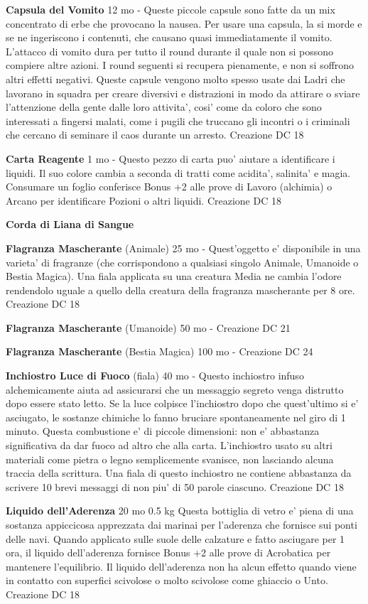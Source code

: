 \documentclass[a4paper,11pt,twoside,openany]{book}
\begin{document}
{\textbf{Capsula del Vomito} 12 mo - Queste piccole capsule sono fatte da un mix concentrato di erbe che provocano la nausea. Per usare una capsula, la si morde e se ne ingeriscono i contenuti, che causano quasi immediatamente il vomito. L'attacco di vomito dura per tutto il round durante il quale non si possono compiere altre azioni. I round seguenti si recupera pienamente, e non si soffrono altri effetti negativi. Queste capsule vengono molto spesso usate dai Ladri che lavorano in squadra per creare diversivi e distrazioni in modo da attirare o sviare l'attenzione della gente dalle loro attivita', cosi' come da coloro che sono interessati a fingersi malati, come i pugili che truccano gli incontri o i criminali che cercano di seminare il caos durante un arresto. Creazione DC 18

\textbf{Carta Reagente} 1 mo - Questo pezzo di carta puo' aiutare a identificare i liquidi. Il suo colore cambia a seconda di tratti come acidita', salinita' e magia. Consumare un foglio conferisce Bonus +2 alle prove di Lavoro (alchimia) o Arcano per identificare Pozioni o altri liquidi. Creazione DC 18

\textbf{Corda di Liana di Sangue}

\textbf{Flagranza Mascherante} (Animale) 25 mo - Quest'oggetto e' disponibile in una varieta' di fragranze (che corrispondono a qualsiasi singolo Animale, Umanoide o Bestia Magica). Una fiala applicata su una creatura Media ne cambia l'odore rendendolo uguale a quello della creatura della fragranza mascherante per 8 ore. Creazione DC 18

\textbf{Flagranza Mascherante} (Umanoide) 50 mo - Creazione DC 21

\textbf{Flagranza Mascherante} (Bestia Magica) 100 mo - Creazione DC 24

\textbf{Inchiostro Luce di Fuoco} (fiala) 40 mo - Questo inchiostro infuso alchemicamente aiuta ad assicurarsi che un messaggio segreto venga distrutto dopo essere stato letto. Se la luce colpisce l'inchiostro dopo che quest'ultimo si e' asciugato, le sostanze chimiche lo fanno bruciare spontaneamente nel giro di 1 minuto. Questa combustione e' di piccole dimensioni: non e' abbastanza significativa da dar fuoco ad altro che alla carta. L'inchiostro usato su altri materiali come pietra o legno semplicemente svanisce, non lasciando alcuna traccia della scrittura. Una fiala di questo inchiostro ne contiene abbastanza da scrivere 10 brevi messaggi di non piu' di 50 parole ciascuno. Creazione DC 18

\textbf{Liquido dell'Aderenza} 20 mo 0.5 kg Questa bottiglia di vetro e' piena di una sostanza appiccicosa apprezzata dai marinai per l'aderenza che fornisce sui ponti delle navi. Quando applicato sulle suole delle calzature e fatto asciugare per 1 ora, il liquido dell'aderenza fornisce Bonus +2 alle prove di Acrobatica per mantenere l'equilibrio. Il liquido dell'aderenza non ha alcun effetto quando viene in contatto con superfici scivolose o molto scivolose come ghiaccio o Unto. Creazione DC 18

}
\end{document}
